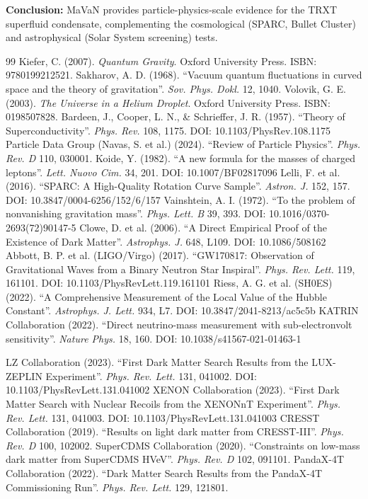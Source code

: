 \documentclass[a4paper,12pt]{article}
\begin{document}
\textbf{Conclusion:} MaVaN provides particle-physics-scale evidence for the TRXT superfluid condensate, complementing the cosmological (SPARC, Bullet Cluster) and astrophysical (Solar System screening) tests.

\begin{thebibliography}{99}
 Kiefer, C. (2007). \textit{Quantum Gravity}. Oxford University Press. ISBN: 9780199212521.
 Sakharov, A. D. (1968). ``Vacuum quantum fluctuations in curved space and the theory of gravitation''. \textit{Sov. Phys. Dokl.} 12, 1040.
 Volovik, G. E. (2003). \textit{The Universe in a Helium Droplet}. Oxford University Press. ISBN: 0198507828.
 Bardeen, J., Cooper, L. N., \& Schrieffer, J. R. (1957). ``Theory of Superconductivity''. \textit{Phys. Rev.} 108, 1175. DOI: 10.1103/PhysRev.108.1175
 Particle Data Group (Navas, S. et al.) (2024). ``Review of Particle Physics''. \textit{Phys. Rev. D} 110, 030001.
 Koide, Y. (1982). ``A new formula for the masses of charged leptons''. \textit{Lett. Nuovo Cim.} 34, 201. DOI: 10.1007/BF02817096
 Lelli, F. et al. (2016). ``SPARC: A High-Quality Rotation Curve Sample''. \textit{Astron. J.} 152, 157. DOI: 10.3847/0004-6256/152/6/157
 Vainshtein, A. I. (1972). ``To the problem of nonvanishing gravitation mass''. \textit{Phys. Lett. B} 39, 393. DOI: 10.1016/0370-2693(72)90147-5
 Clowe, D. et al. (2006). ``A Direct Empirical Proof of the Existence of Dark Matter''. \textit{Astrophys. J.} 648, L109. DOI: 10.1086/508162
 Abbott, B. P. et al. (LIGO/Virgo) (2017). ``GW170817: Observation of Gravitational Waves from a Binary Neutron Star Inspiral''. \textit{Phys. Rev. Lett.} 119, 161101. DOI: 10.1103/PhysRevLett.119.161101
 Riess, A. G. et al. (SH0ES) (2022). ``A Comprehensive Measurement of the Local Value of the Hubble Constant''. \textit{Astrophys. J. Lett.} 934, L7. DOI: 10.3847/2041-8213/ac5c5b
 KATRIN Collaboration (2022). ``Direct neutrino-mass measurement with sub-electronvolt sensitivity''. \textit{Nature Phys.} 18, 160. DOI: 10.1038/s41567-021-01463-1


 LZ Collaboration (2023). ``First Dark Matter Search Results from the LUX-ZEPLIN Experiment''. \textit{Phys. Rev. Lett.} 131, 041002. DOI: 10.1103/PhysRevLett.131.041002
 XENON Collaboration (2023). ``First Dark Matter Search with Nuclear Recoils from the XENONnT Experiment''. \textit{Phys. Rev. Lett.} 131, 041003. DOI: 10.1103/PhysRevLett.131.041003
 CRESST Collaboration (2019). ``Results on light dark matter from CRESST-III''. \textit{Phys. Rev. D} 100, 102002.
 SuperCDMS Collaboration (2020). ``Constraints on low-mass dark matter from SuperCDMS HVeV''. \textit{Phys. Rev. D} 102, 091101.
 PandaX-4T Collaboration (2022). ``Dark Matter Search Results from the PandaX-4T Commissioning Run''. \textit{Phys. Rev. Lett.} 129, 121801.


\end{thebibliography}
\end{document}

